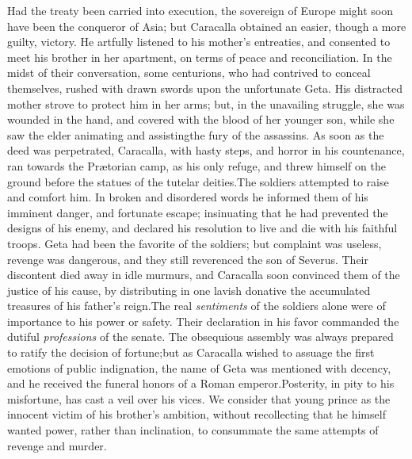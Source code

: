 Had the treaty been carried into execution, the sovereign of
Europe might soon have been the conqueror of Asia; but Caracalla
obtained an easier, though a more guilty, victory. He artfully
listened to his mother’s entreaties, and consented to meet his
brother in her apartment, on terms of peace and reconciliation.
In the midst of their conversation, some centurions, who had
contrived to conceal themselves, rushed with drawn swords upon
the unfortunate Geta. His distracted mother strove to protect him
in her arms; but, in the unavailing struggle, she was wounded in
the hand, and covered with the blood of her younger son, while
she saw the elder animating and assisting\footnotemark[21] the fury of the
assassins. As soon as the deed was perpetrated, Caracalla, with
hasty steps, and horror in his countenance, ran towards the
Prætorian camp, as his only refuge, and threw himself on the
ground before the statues of the tutelar deities.\footnotemark[22] The soldiers
attempted to raise and comfort him. In broken and disordered
words he informed them of his imminent danger, and fortunate
escape; insinuating that he had prevented the designs of his
enemy, and declared his resolution to live and die with his
faithful troops. Geta had been the favorite of the soldiers; but
complaint was useless, revenge was dangerous, and they still
reverenced the son of Severus. Their discontent died away in idle
murmurs, and Caracalla soon convinced them of the justice of his
cause, by distributing in one lavish donative the accumulated
treasures of his father’s reign.\footnotemark[23] The real \textit{sentiments} of the
soldiers alone were of importance to his power or safety. Their
declaration in his favor commanded the dutiful \textit{professions} of
the senate. The obsequious assembly was always prepared to ratify
the decision of fortune;\footnotemark[231] but as Caracalla wished to assuage
the first emotions of public indignation, the name of Geta was
mentioned with decency, and he received the funeral honors of a
Roman emperor.\footnotemark[24] Posterity, in pity to his misfortune, has cast
a veil over his vices. We consider that young prince as the
innocent victim of his brother’s ambition, without recollecting
that he himself wanted power, rather than inclination, to
consummate the same attempts of revenge and murder.\footnotemark[241]


